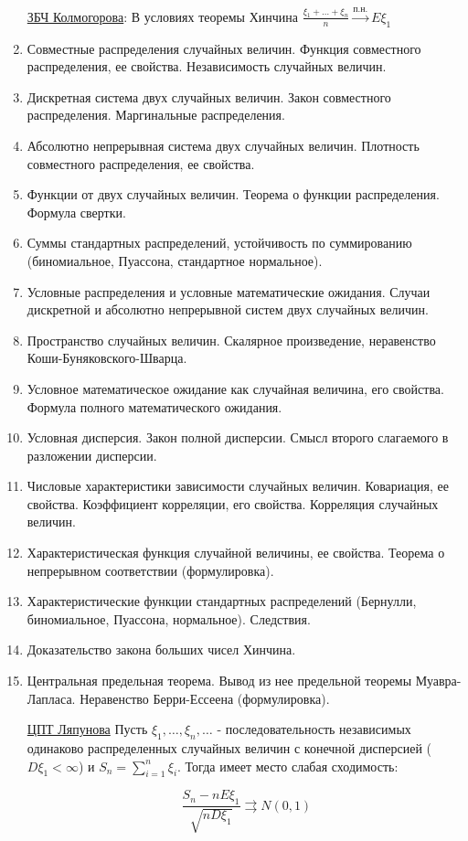 \documentclass[12pt]{article}
\begin{document}
\begin{enumerate}
    \hyperlink{lawofbignumberskolmogorov}{ЗБЧ Колмогорова}: В условиях теоремы Хинчина $\frac{\xi_1 + \dots + \xi_n}{n} \overset{\text{п.н.}}{\longrightarrow} E\xi_1$

    \item Совместные распределения случайных величин. Функция совместного распределения, ее свойства. Независимость случайных величин.
    \item Дискретная система двух случайных величин. Закон совместного распределения. Маргинальные распределения.
    \item Абсолютно непрерывная система двух случайных величин. Плотность совместного распределения, ее свойства.
    \item Функции от двух случайных величин. Теорема о функции распределения. Формула свертки.
    \item Суммы стандартных распределений, устойчивость по суммированию (биномиальное, Пуассона, стандартное нормальное).
    \item Условные распределения и условные математические ожидания. Случаи дискретной и абсолютно непрерывной систем двух случайных величин.
    \item Пространство случайных величин. Скалярное произведение, неравенство Коши-Буняковского-Шварца. 
    \item Условное математическое ожидание как случайная величина, его свойства. Формула полного математического ожидания.
    \item Условная дисперсия. Закон полной дисперсии. Смысл второго слагаемого в разложении дисперсии.
    \item Числовые характеристики зависимости случайных величин. Ковариация, ее свойства. Коэффициент корреляции, его свойства. Корреляция случайных величин.
    \item Характеристическая функция случайной величины, ее свойства. Теорема о непрерывном соответствии (формулировка).
    \item Характеристические функции стандартных распределений (Бернулли, биномиальное, Пуассона, нормальное). Следствия.
    \item Доказательство закона больших чисел Хинчина.
    \item Центральная предельная теорема. Вывод из нее предельной теоремы Муавра-Лапласа. Неравенство Берри-Ессеена (формулировка). 

    \hyperlink{centrallimittheorem}{ЦПТ Ляпунова} \Ths Пусть $\xi_1, \dots, \xi_n, \dots$ - последовательность независимых одинаково распределенных случайных величин
    с конечной дисперсией ($D\xi_1 < \infty$) и $S_n = \sum_{i = 1}^n \xi_i$. Тогда имеет место слабая сходимость:

    \[\frac{S_n - nE\xi_1}{\sqrt{nD\xi_1}} \rightrightarrows N(0, 1)\]


\end{enumerate}

\end{document}

